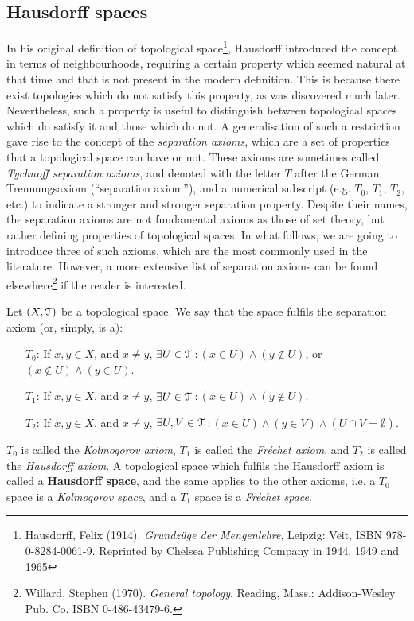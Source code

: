 \subsection{Hausdorff spaces}\label{subsec:hausdorff-spaces}

In his original definition of topological space\footnote{Hausdorff, Felix (1914). \emph{Grundz\"{u}ge der Mengenlehre}, Leipzig: Veit, ISBN 978-0-8284-0061-9. Reprinted by Chelsea Publishing Company in 1944, 1949 and 1965}, Hausdorff introduced the concept in terms of neighbourhoods, requiring a certain property which seemed natural at that time and that is not present in the modern definition.
This is because there exist topologies which do not satisfy this property, as was discovered much later.
Nevertheless, such a property is useful to distinguish between topological spaces which do satisfy it and those which do not.
A generalisation of such a restriction gave rise to the concept of the \emph{separation axioms}, which are a set of properties that a topological space can have or not.
These axioms are sometimes called \emph{Tychnoff separation axioms}, and denoted with the letter $T$ after the German Trennungsaxiom (``separation axiom''), and a numerical subscript (e.g. $T_0$, $T_1$, $T_2$, etc.) to indicate a stronger and stronger separation property.
Despite their names, the separation axioms are not fundamental axioms as those of set theory, but rather defining properties of topological spaces.
In what follows, we are going to introduce three of such axioms, which are the most commonly used in the literature.
However, a more extensive list of separation axioms can be found elsewhere\footnote{Willard, Stephen (1970). \emph{General topology}. Reading, Mass.: Addison-Wesley Pub. Co. ISBN 0-486-43479-6.} if the reader is interested.

\begin{definition}
	Let $(X, \EuScript{T})$ be a topological space. We say that the space fulfils the separation axiom (or, simply, is a):
	\begin{itemize}
		\item[$T_0$:] If $x,y\in X$, and $x\neq y$, $\exists U\in\EuScript{T}$\,:\,$(x\in U) \land (y\notin U)$, or $(x\notin U) \land (y\in U)$.
		\item[$T_1$:] If $x,y\in X$, and $x\neq y$, $\exists U\in\EuScript{T}$\,:\,$(x\in U)\land (y\notin U)$.
		\item[$T_2$:] If $x,y\in X$, and $x\neq y$, $\exists U,V\in\EuScript{T}$\,:\,$(x\in U)\land (y\in V) \land (U\cap V=\emptyset)$.
	\end{itemize}
	$T_0$ is called the \emph{Kolmogorov axiom}, $T_1$ is called the \emph{Fr\'{e}chet axiom}, and $T_2$ is called the \emph{Hausdorff axiom}.
	A topological space which fulfils the Hausdorff axiom is called a \textbf{Hausdorff space}, and the same applies to the other axioms, i.e. a $T_0$ space is a \emph{Kolmogorov space}, and a $T_1$ space is a \emph{Fr\'{e}chet space}.
\end{definition}

